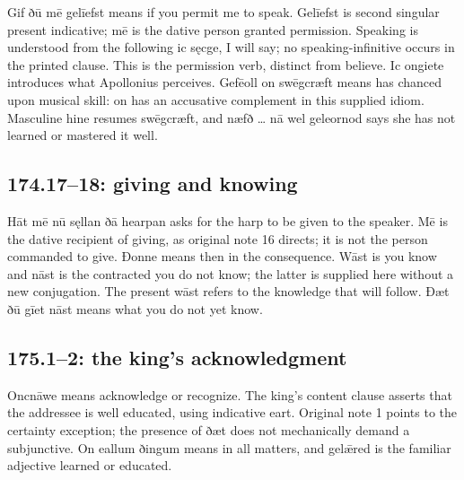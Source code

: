 Gif ðū mē gelīefst means if you permit me to speak. Gelīefst is second singular present indicative; mē is the dative person granted permission. Speaking is understood from the following ic sęcge, I will say; no speaking-infinitive occurs in the printed clause. This is the permission verb, distinct from believe. Ic ongiete introduces what Apollonius perceives. Gefēoll on swēgcræft means has chanced upon musical skill: on has an accusative complement in this supplied idiom. Masculine hine resumes swēgcræft, and næfð … nā wel geleornod says she has not learned or mastered it well.

\subsection*{174.17–18: giving and knowing}

Hāt mē nū sęllan ðā hearpan asks for the harp to be given to the speaker. Mē is the dative recipient of giving, as original note 16 directs; it is not the person commanded to give. Ðonne means then in the consequence. Wāst is you know and nāst is the contracted you do not know; the latter is supplied here without a new conjugation. The present wāst refers to the knowledge that will follow. Ðæt ðū gīet nāst means what you do not yet know.

\subsection*{175.1–2: the king’s acknowledgment}

Oncnāwe means acknowledge or recognize. The king’s content clause asserts that the addressee is well educated, using indicative eart. Original note 1 points to the certainty exception; the presence of ðæt does not mechanically demand a subjunctive. On eallum ðingum means in all matters, and gelǣred is the familiar adjective learned or educated.


